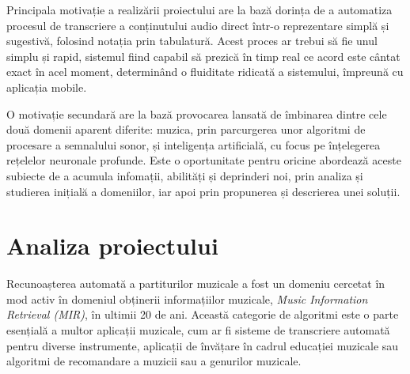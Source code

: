 \documentclass[a4paper,12pt]{report}
\begin{document}
Principala motivație a realizării proiectului are la bază dorința de a automatiza
procesul de transcriere a conținutului audio direct într-o reprezentare simplă și 
sugestivă, folosind notația prin tabulatură. Acest proces ar trebui să fie unul 
simplu și rapid, sistemul fiind capabil să prezică în timp real ce acord 
este cântat exact în acel moment, determinând o fluiditate ridicată a sistemului, 
împreună cu aplicația mobile.

O motivație secundară are la bază provocarea lansată de îmbinarea dintre cele două
domenii aparent diferite: muzica, prin parcurgerea unor 
algoritmi de procesare a semnalului sonor,
și inteligența artificială, cu focus pe înțelegerea 
rețelelor neuronale profunde. Este o oportunitate 
pentru oricine abordează aceste subiecte de a acumula
infomații, abilități și deprinderi noi, prin analiza și studierea inițială a domeniilor, iar 
apoi prin propunerea și descrierea unei soluții.

\newpage
\section{Analiza proiectului}
Recunoașterea automată a partiturilor muzicale a fost un domeniu cercetat în mod activ în domeniul
obținerii informațiilor muzicale, \emph{Music Information Retrieval (MIR)}, în ultimii 20 de ani.
Această categorie de algoritmi este o parte esențială a multor aplicații muzicale, cum ar fi sisteme
de transcriere automată pentru diverse instrumente, aplicații de învățare în cadrul educației muzicale sau
algoritmi de recomandare a muzicii sau a genurilor muzicale.
\end{document}
